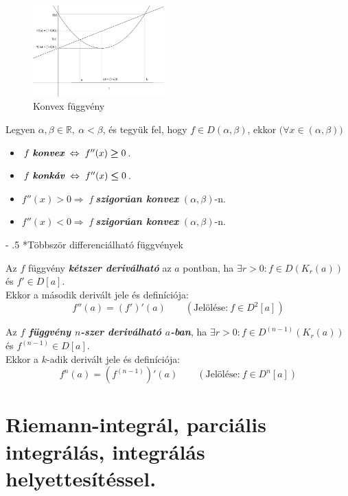 \documentclass[12pt,margin=0px]{article}
\makeatletter
\renewcommand\paragraph{%
	\@startsection{paragraph}{4}{0mm}%
	{-\baselineskip}%
	{.5\baselineskip}%
	{\normalfont\normalsize\bfseries}}
\makeatother
\begin{document}
    \begin{figure}[H]
        \centering
        \includegraphics[width=0.45\textwidth]{img/konvex.png}
        \caption{Konvex függvény}
    \end{figure}

	\noindent Legyen $\alpha, \beta \in \mathbb{R},\ \alpha < \beta$, és tegyük fel, hogy $f \in D(\alpha, \beta)$, ekkor $\big(\forall x \in (\alpha, \beta)\big)$
    \begin{itemize}
        \item $f\ \textit{\textbf{konvex}}\ \Leftrightarrow\ f''(x) \boldsymbol{\geq} 0$.
        \item $f\ \textit{\textbf{konkáv}}\ \Leftrightarrow\ f''(x) \boldsymbol{\leq} 0$.
        \item $f''(x) \boldsymbol{>} 0 \Rightarrow$ \emph{f} \emph{\textbf{szigorúan konvex}} $(\alpha, \beta)$-n.
        \item $f''(x) \boldsymbol{<} 0 \Rightarrow$ \emph{f} \emph{\textbf{szigorúan konvex}} $(\alpha, \beta)$-n.
    \end{itemize}

    \paragraph*{Többször differenciálható függvények}

    \noindent Az $f$ függvény \textbf{\emph{kétszer deriválható}} az $a$ pontban, ha $\exists r > 0: f \in D(K_{r}(a))$ és $f' \in D[a]$.\\
    Ekkor a második derivált jele és definíciója:
    \[
        f''(a) = (f')'(a) \qquad (\text{Jelölése:}\ f \in D^{2}[a])
    \]

    \noindent Az \textbf{\emph{$f$ függvény $n$-szer deriválható $a$-ban}}, ha $\exists r > 0: f \in D^{(n-1)}(K_{r}(a))$ és $f^{(n-1)} \in D[a]$.\\
    Ekkor a $k$-adik derivált jele és definíciója:
    \[
        f^{n}(a) = (f^{(n-1)})'(a) \qquad (\text{Jelölése:}\ f \in D^{n}[a])
    \]

	\section*{Riemann-integrál, parciális integrálás, integrálás helyettesítéssel.}
\end{document}
